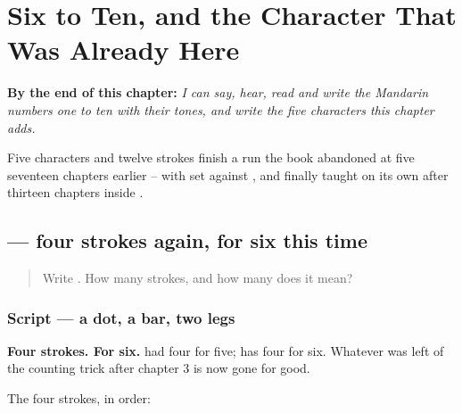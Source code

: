 
\chapter{Six to Ten, and the Character That Was Already Here}
\label{ch:zh-count-ten}

\begin{chapteropening}
\textbf{By the end of this chapter:} \emph{I can say, hear, read and write the Mandarin numbers one to ten with their tones, and write the five characters this chapter adds.}

Five characters and twelve strokes finish a run the book abandoned at five seventeen chapters earlier -- with  set against , and  finally taught on its own after thirteen chapters inside .
\end{chapteropening}

\section[\texorpdfstring{\zh{六} (liù)}{六 (liù)}]{ — four strokes again, for six this time}

\label{lesson:ZH-W20-liu}



\begin{quote}
Write . How many strokes, and how many does it mean?
\end{quote}

\subsection*{Script — a dot, a bar, two legs}

\begin{quote}
\end{quote}

\textbf{Four strokes. For six.}  had four for five;  has four for six. Whatever was left of the counting trick after chapter 3 is now gone for good.

The four strokes, in order:

